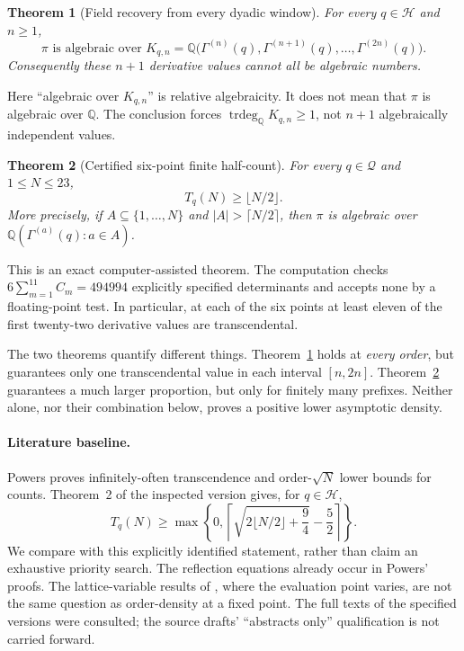 \documentclass[11pt,a4paper]{article}
\newtheorem{theorem}{Theorem}[section]
\theoremstyle{definition}\newtheorem{definition}[theorem]{Definition}
\theoremstyle{remark}\newtheorem{remark}[theorem]{Remark}
\newcommand{\Q}{\mathbb Q}\newcommand{\Qb}{\overline{\mathbb Q}}
\begin{document}
\begin{theorem}[Field recovery from every dyadic window]\label{thm:window}
For every $q\in\mathcal H$ and $n\ge1$,
\begin{equation}\label{eq:windowfield}
\pi\text{ is algebraic over }
K_{q,n}=\Q\bigl(\Gamma^{(n)}(q),\Gamma^{(n+1)}(q),\ldots,\Gamma^{(2n)}(q)\bigr).
\end{equation}
Consequently these $n+1$ derivative values cannot all be algebraic numbers.
\end{theorem}
Here ``algebraic over $K_{q,n}$'' is relative algebraicity. It does not mean that $\pi$ is algebraic over $\Q$. The conclusion forces $\operatorname{trdeg}_{\Q}K_{q,n}\ge1$, not $n+1$ algebraically independent values.

\begin{theorem}[Certified six-point finite half-count]\label{thm:main}
For every $q\in\mathcal Q$ and $1\le N\le23$,
\begin{equation}\label{eq:main}
T_q(N)\ge\lfloor N/2\rfloor.
\end{equation}
More precisely, if $A\subseteq\{1,\ldots,N\}$ and $|A|>\lceil N/2\rceil$, then $\pi$ is algebraic over $\Q(\Gamma^{(a)}(q):a\in A)$.
\end{theorem}
This is an exact computer-assisted theorem. The computation checks $6\sum_{m=1}^{11}C_m=494994$ explicitly specified determinants and accepts none by a floating-point test. In particular, at each of the six points at least eleven of the first twenty-two derivative values are transcendental.

The two theorems quantify different things. Theorem~\ref{thm:window} holds at \emph{every order}, but guarantees only one transcendental value in each interval $[n,2n]$. Theorem~\ref{thm:main} guarantees a much larger proportion, but only for finitely many prefixes. Neither alone, nor their combination below, proves a positive lower asymptotic density.

\paragraph{Literature baseline.}
Powers \cite{Powers1,Powers2,Powers3} proves infinitely-often transcendence and order-$\sqrt N$ lower bounds for counts. Theorem~2 of the inspected version \cite{Powers2} gives, for $q\in\mathcal H$,
\begin{equation}\label{eq:powers}
T_q(N)\ge\max\left\{0,\left\lceil\sqrt{2\lfloor N/2\rfloor+\frac94}-\frac52\right\rceil\right\}.
\end{equation}
We compare with this explicitly identified statement, rather than claim an exhaustive priority search. The reflection equations already occur in Powers' proofs. The lattice-variable results of \cite{Powers3}, where the evaluation point varies, are not the same question as order-density at a fixed point. The full texts of the specified versions were consulted; the source drafts' ``abstracts only'' qualification is not carried forward.
\end{document}
